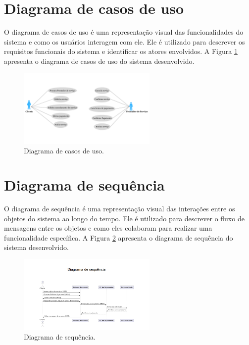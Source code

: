 \section{Diagrama de casos de uso}
\label{sec:casos}
O diagrama de casos de uso é uma representação visual das funcionalidades do sistema e como os usuários interagem com ele. Ele é utilizado para descrever os requisitos funcionais do sistema e identificar os atores envolvidos. A Figura \ref{fig:diagrama-uso} apresenta o diagrama de casos de uso do sistema desenvolvido.

\begin{figure}[H]
    \centering
    \includegraphics[width=0.6\textwidth]{Figures/Diagrama_de_uso.png} %
    \caption{Diagrama de casos de uso.}
    \label{fig:diagrama-uso}
\end{figure}


\section{Diagrama de sequência}
\label{sec:sequencia}   
O diagrama de sequência é uma representação visual das interações entre os objetos do sistema ao longo do tempo. Ele é utilizado para descrever o fluxo de mensagens entre os objetos e como eles colaboram para realizar uma funcionalidade específica. A Figura \ref{fig:diagrama-sequencia} apresenta o diagrama de sequência do sistema desenvolvido.

\begin{figure}[H]
    \centering
    \includegraphics[width=0.6\textwidth]{Figures/seq.png} %
    \caption{Diagrama de sequência.}
    \label{fig:diagrama-sequencia}
\end{figure}

